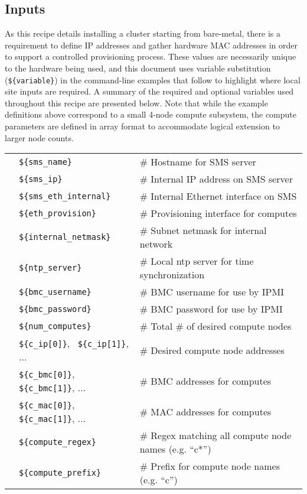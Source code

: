 
\subsection{Inputs} \label{sec:inputs}
As this recipe details installing a cluster starting from bare-metal, there is a requirement to define IP addresses and
gather hardware MAC addresses in order to support a controlled provisioning process. These values are necessarily unique
to the hardware being used, and this document uses variable substitution (\texttt{\$\{variable\}}) in the command-line
examples that follow to highlight where local site inputs are required. A summary of the required and optional variables
used throughout this recipe are presented below. Note that while the example definitions above correspond to a small
4-node compute subsystem, the compute parameters are defined in array format to accommodate logical extension to larger
node counts. \\

\vspace*{0.2cm}
\begin{tabular}{@{}>{\textbullet}l p{7cm} l}
& \texttt{\$\{sms\_name\}} & {\small \# Hostname for SMS server} \\
& \texttt{\$\{sms\_ip\}} & {\small \# Internal IP address on SMS server}  \\
& \texttt{\$\{sms\_eth\_internal\}} & {\small \# Internal Ethernet interface on SMS} \\
& \texttt{\$\{eth\_provision\}} & {\small \# Provisioning interface for computes} \\
& \texttt{\$\{internal\_netmask\}} & {\small \# Subnet netmask for internal network} \\
& \texttt{\$\{ntp\_server\}} & {\small \# Local ntp server for time synchronization} \\
& \texttt{\$\{bmc\_username\}} & {\small \# BMC username for use by IPMI} \\
& \texttt{\$\{bmc\_password\}} & {\small \# BMC password for use by IPMI} \\
& \texttt{\$\{num\_computes\}} & {\small \# Total \# of desired compute nodes} \\
& \texttt{\$\{c\_ip[0]\}}, \, \texttt{\$\{c\_ip[1]\}}, ... & {\small \# Desired compute node addresses} \\
& \texttt{\$\{c\_bmc[0]\}}, \texttt{\$\{c\_bmc[1]\}}, ... & {\small \# BMC addresses for computes} \\
& \texttt{\$\{c\_mac[0]\}}, \texttt{\$\{c\_mac[1]\}}, ... & {\small \# MAC addresses for computes} \\
& \texttt{\$\{compute\_regex\}} & {\small \# Regex matching all compute node names (e.g. ``c*'')} \\
& \texttt{\$\{compute\_prefix\}} & {\small \# Prefix for compute node names (e.g. ``c'')} \\
\end{tabular}

